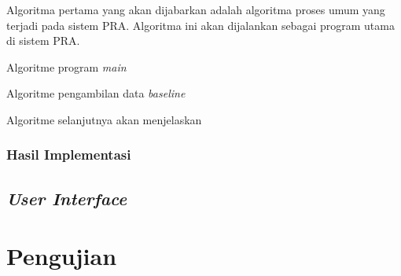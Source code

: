 Algoritma pertama yang akan dijabarkan adalah algoritma proses umum yang terjadi pada sistem PRA. Algoritma ini akan dijalankan sebagai program utama di sistem PRA.
\begin{algorithm}[hbt!]
	
	
	\caption{Algoritme program \textit{main}}\label{alg:main}
\end{algorithm}

\begin{algorithm}[hbt!]
	
	
	\caption{Algoritme pengambilan data \textit{baseline}}\label{alg:main}
\end{algorithm}

Algoritme selanjutnya akan menjelaskan 








\subsubsection{Hasil Implementasi}

\subsection{\textit{User Interface}}


\section{Pengujian}
